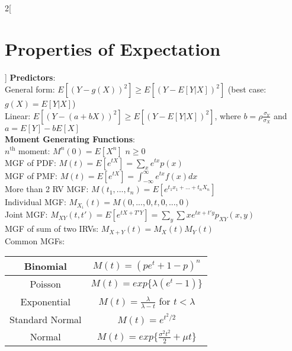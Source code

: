 \documentclass{article}
\begin{document}
\begin{multicols}{2}[\section*{Properties of Expectation}]
    \textbf{Predictors}:\\
    General form: $E[(Y - g(X))^2] \geq E[(Y - E[Y \vert X])^2]$ (best case: $g(X) = E[Y \vert X]$)\\
    Linear: $E[(Y - (a + bX))^2] \geq E[(Y - E[Y \vert X])^2]$, where $b = \rho\frac{\sigma_Y}{\sigma_X}$ and $a = E[Y] - bE[X]$\\
    
    \textbf{Moment Generating Functions}:\\
    $n^{\text{th}}$ moment:  $M^n(0) = E[X^n]$ $n \geq 0$\\
    MGF of PDF: $M(t) = E[e^{tX}] = \sum_{x}e^{tx}p(x)$\\
    MGF of PMF: $M(t) = E[e^{tX}] = \int_{-\infty}^{\infty}e^{tx}f(x)dx$\\
    More than 2 RV MGF: $M(t_1, ..., t_n) = E[e^{t_1x_1 + ... + t_nX_n}]$\\
    Individual MGF: $M_{X_i}(t) = M(0,... , 0, t, 0,..., 0)$\\
    Joint MGF: $M_{XY}(t, t') = E[e^{tX+T' Y}] = \sum_{y}\sum{x}e^{tx+t' y}p_{XY}(x,y)$ \\
    MGF of sum of two IRVs: $M_{X+Y}(t) = M_X(t)M_Y(t)$\\
    Common MGFs:\\
	\begin{tabular}{|c|c|}
		\hline
		Binomial & $M(t) = (pe^t + 1 - p)^n$ \\
		\hline
		Poisson & $M(t) = exp\{\lambda(e^t - 1)\} $\\
		\hline
		Exponential & $M(t) = \frac{\lambda}{\lambda - t }$ for $t < \lambda$\\
		\hline
		Standard Normal & $M(t) = e^{t^2/2}$ \\
		\hline
		Normal & $M(t) = exp\{\frac{\sigma^2t^2}{2} + {\mu}t\}$\\
		\hline
	\end{tabular}
    \end{multicols}
\end{document}
